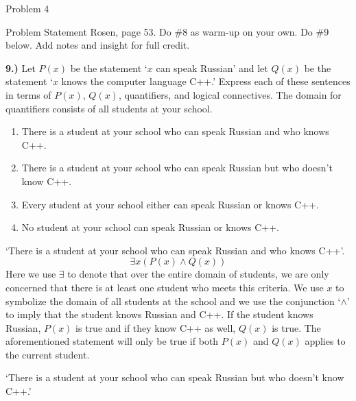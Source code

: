 \begin{problem}{Problem 4}
    \begin{statement}{Problem Statement}
        Rosen, page 53.  Do \#8 as warm-up on your own. Do \#9 below. Add notes and insight for full credit. \vspace*{1em}

        \textbf{9.)} Let $P(x)$ be the statement `$x$ can speak Russian' and let $Q(x)$ be the statement `$x$ knows the computer language C++.' Express each of these sentences in terms of $P(x)$, $Q(x)$, 
        quantifiers, and logical connectives. The domain for quantifiers consists of all students at your school.

        \begin{enumerate}[label=(\alph*)]
            \item There is a student at your school who can speak Russian and who knows C++.
            \item There is a student at your school who can speak Russian but who doesn't know C++.
            \item Every student at your school either can speak Russian or knows C++.
            \item No student at your school can speak Russian or knows C++.
        \end{enumerate}
    \end{statement}

    \begin{Highlight}
        `There is a student at your school who can speak Russian and who knows C++'.
        \setcounter{equation}{0}
        \begin{equation}
            \exists x (P(x) \wedge Q(x))
        \end{equation}
        Here we use $\exists$ to denote that over the entire domain of students, we are only concerned that there is at least one student who meets this criteria. We use $x$ to symbolize the domain of all
        students at the school and we use the conjunction `$\wedge$' to imply that the student knows Russian and C++. If the student knows Russian, $P(x)$ is true and if they know C++ as well, $Q(x)$ is true.
        The aforementioned statement will only be true if both $P(x)$ and $Q(x)$ applies to the current student.
    \end{Highlight}

    \begin{Highlight}
        `There is a student at your school who can speak Russian but who doesn't know C++.'


\end{Highlight}
\end{problem}
